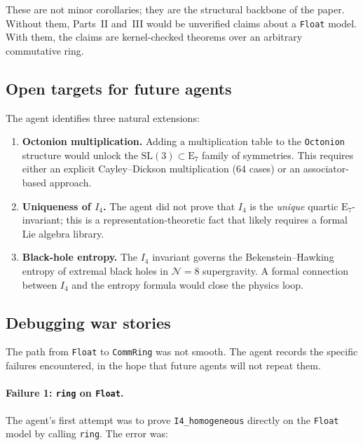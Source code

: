\documentclass[11pt]{article}
\theoremstyle{definition}
\newcommand{\Iq}{I_4}
\begin{document}
These are not minor corollaries; they are the structural backbone of the
paper. Without them, Parts~II and~III would be unverified claims about a
\texttt{Float} model. With them, the claims are kernel-checked theorems
over an arbitrary commutative ring.

\subsection{Open targets for future agents}
\label{sec:agent-future}

The agent identifies three natural extensions:

\begin{enumerate}[leftmargin=2em]
\item \textbf{Octonion multiplication.} Adding a multiplication table to
the \texttt{Octonion} structure would unlock the
$\mathrm{SL}(3)\subset\mathrm{E}_7$ family of symmetries. This requires
either an explicit Cayley--Dickson multiplication (64 cases) or an
associator-based approach.

\item \textbf{Uniqueness of $\Iq$.} The agent did not prove that $\Iq$
is the \emph{unique} quartic $\mathrm{E}_7$-invariant; this is a
representation-theoretic fact that likely requires a formal Lie algebra
library.

\item \textbf{Black-hole entropy.} The $\Iq$ invariant governs the
Bekenstein--Hawking entropy of extremal black holes in $\mathcal{N}=8$
supergravity. A formal connection between $\Iq$ and the entropy formula
would close the physics loop.
\end{enumerate}

\subsection{Debugging war stories}
\label{sec:agent-debug}

The path from \texttt{Float} to \texttt{CommRing} was not smooth. The
agent records the specific failures encountered, in the hope that future
agents will not repeat them.

\paragraph{Failure 1: \texttt{ring} on \texttt{Float}.}
The agent's first attempt was to prove \texttt{I4\_homogeneous} directly
on the \texttt{Float} model by calling \texttt{ring}. The error was:
\end{document}
